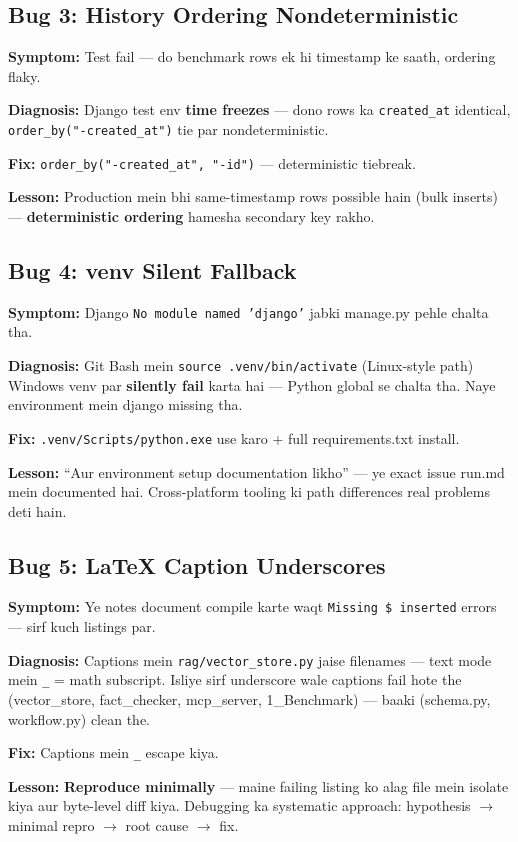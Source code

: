 \subsection{Bug 3: History Ordering Nondeterministic}

\begin{interviewbox}
\textbf{Symptom:} Test fail --- do benchmark rows ek hi timestamp ke saath, ordering flaky.

\textbf{Diagnosis:} Django test env \textbf{time freezes} --- dono rows ka \texttt{created\_at} identical, \texttt{order\_by("-created\_at")} tie par nondeterministic.

\textbf{Fix:} \texttt{order\_by("-created\_at", "-id")} --- deterministic tiebreak.

\textbf{Lesson:} Production mein bhi same-timestamp rows possible hain (bulk inserts) --- \textbf{deterministic ordering} hamesha secondary key rakho.
\end{interviewbox}

\subsection{Bug 4: venv Silent Fallback}

\begin{interviewbox}
\textbf{Symptom:} Django \texttt{No module named 'django'} jabki manage.py pehle chalta tha.

\textbf{Diagnosis:} Git Bash mein \texttt{source .venv/bin/activate} (Linux-style path) Windows venv par \textbf{silently fail} karta hai --- Python global se chalta tha. Naye environment mein django missing tha.

\textbf{Fix:} \texttt{.venv/Scripts/python.exe} use karo + full requirements.txt install.

\textbf{Lesson:} ``Aur environment setup documentation likho'' --- ye exact issue run.md mein documented hai. Cross-platform tooling ki path differences real problems deti hain.
\end{interviewbox}

\subsection{Bug 5: LaTeX Caption Underscores}

\begin{interviewbox}
\textbf{Symptom:} Ye notes document compile karte waqt \texttt{Missing \$ inserted} errors --- sirf kuch listings par.

\textbf{Diagnosis:} Captions mein \texttt{rag/vector\_store.py} jaise filenames --- text mode mein \texttt{\_} = math subscript. Isliye sirf underscore wale captions fail hote the (vector\_store, fact\_checker, mcp\_server, 1\_Benchmark) --- baaki (schema.py, workflow.py) clean the.

\textbf{Fix:} Captions mein \texttt{\_} escape kiya.

\textbf{Lesson:} \textbf{Reproduce minimally} --- maine failing listing ko alag file mein isolate kiya aur byte-level diff kiya. Debugging ka systematic approach: hypothesis $\rightarrow$ minimal repro $\rightarrow$ root cause $\rightarrow$ fix.
\end{interviewbox}
